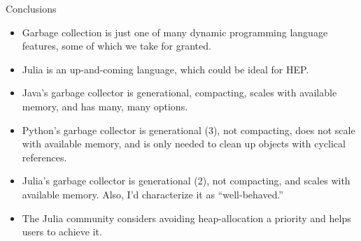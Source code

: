 \documentclass[aspectratio=169]{beamer}
\begin{document}
\begin{frame}{Conclusions}
\large
\vspace{0.5 cm}
\begin{itemize}\setlength{\itemsep}{0.25 cm}
\item Garbage collection is just one of many dynamic programming language features, some of which we take for granted.
\item<2-> Julia is an up-and-coming language, which could be ideal for HEP.
\item<3-> Java's garbage collector is generational, compacting, scales with available memory, and has many, many options.
\item<4-> Python's garbage collector is generational (3), not compacting, does not scale with available memory, and is only needed to clean up objects with cyclical references.
\item<5-> Julia's garbage collector is generational (2), not compacting, and scales with available memory. Also, I'd characterize it as ``well-behaved.''
\item<6-> The Julia community considers avoiding heap-allocation a priority and helps users to achieve it.
\end{itemize}
\end{frame}
\end{document}
